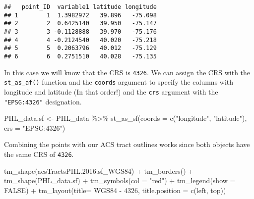 \documentclass[
]{article}
\newenvironment{Shaded}{\begin{snugshade}}{\end{snugshade}}
\newcommand{\AttributeTok}[1]{\textcolor[rgb]{0.77,0.63,0.00}{#1}}
\newcommand{\ConstantTok}[1]{\textcolor[rgb]{0.00,0.00,0.00}{#1}}
\newcommand{\FloatTok}[1]{\textcolor[rgb]{0.00,0.00,0.81}{#1}}
\newcommand{\FunctionTok}[1]{\textcolor[rgb]{0.00,0.00,0.00}{#1}}
\newcommand{\NormalTok}[1]{#1}
\newcommand{\OtherTok}[1]{\textcolor[rgb]{0.56,0.35,0.01}{#1}}
\newcommand{\SpecialCharTok}[1]{\textcolor[rgb]{0.00,0.00,0.00}{#1}}
\newcommand{\StringTok}[1]{\textcolor[rgb]{0.31,0.60,0.02}{#1}}
\begin{document}
\begin{verbatim}
##   point_ID  variable1 latitude longitude
## 1        1  1.3982972   39.896   -75.098
## 2        2  0.6425140   39.950   -75.147
## 3        3 -0.1128888   39.970   -75.176
## 4        4 -0.2124540   40.020   -75.218
## 5        5  0.2063796   40.012   -75.129
## 6        6  0.2751510   40.028   -75.135
\end{verbatim}

In this case we will know that the CRS is \texttt{4326}. We can assign
the CRS with the \texttt{st\_as\_af()} function and the \texttt{coords}
argument to specify the columns with longitude and latitude (In that
order!) and the \texttt{crs} argument with the \texttt{"EPSG:4326"}
designation.

\begin{Shaded}
\begin{Highlighting}[]
\NormalTok{PHL\_data.sf }\OtherTok{\textless{}{-}}\NormalTok{ PHL\_data }\SpecialCharTok{\%\textgreater{}\%} 
  \FunctionTok{st\_as\_sf}\NormalTok{(}\AttributeTok{coords =} \FunctionTok{c}\NormalTok{(}\StringTok{"longitude"}\NormalTok{, }\StringTok{"latitude"}\NormalTok{),}
           \AttributeTok{crs =} \StringTok{"EPSG:4326"}\NormalTok{) }
\end{Highlighting}
\end{Shaded}

Combining the points with our ACS tract outlines works since both
objects have the same CRS of \texttt{4326}.

\begin{Shaded}
\begin{Highlighting}[]
\FunctionTok{tm\_shape}\NormalTok{(acsTractsPHL.}\FloatTok{2016.}\NormalTok{sf\_WGS84) }\SpecialCharTok{+}
    \FunctionTok{tm\_borders}\NormalTok{() }\SpecialCharTok{+}
\FunctionTok{tm\_shape}\NormalTok{(PHL\_data.sf) }\SpecialCharTok{+}
    \FunctionTok{tm\_symbols}\NormalTok{(}\AttributeTok{col =} \StringTok{"red"}\NormalTok{) }\SpecialCharTok{+}
\FunctionTok{tm\_legend}\NormalTok{(}\AttributeTok{show =} \ConstantTok{FALSE}\NormalTok{) }\SpecialCharTok{+}
   \FunctionTok{tm\_layout}\NormalTok{(}\AttributeTok{title=} \StringTok{\textquotesingle{}WGS84 {-} 4326\textquotesingle{}}\NormalTok{, }
            \AttributeTok{title.position =} \FunctionTok{c}\NormalTok{(}\StringTok{\textquotesingle{}left\textquotesingle{}}\NormalTok{, }\StringTok{\textquotesingle{}top\textquotesingle{}}\NormalTok{))}
\end{Highlighting}
\end{Shaded}
\end{document}
